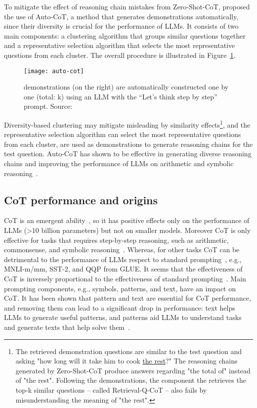 To mitigate the effect of reasoning chain mistakes from Zero-Shot-CoT, \textcite{zhang2022automatic} proposed the use of Auto-CoT, a method that generates demonstrations automatically, since their diversity is crucial for the performance of LLMs.
It consists of two main components: a clustering algorithm that groups similar questions together and a representative selection algorithm that selects the most representative questions from each cluster.
The overall procedure is illustrated in Figure~\ref{fig:auto-cot}.
\begin{figure}[h!]
	\centering
	\texttt{[image: auto-cot]}
	\caption{demonstrations (on the right) are automatically constructed one by one (total: k) using an LLM with the “Let’s think step by step” prompt. Source: \textcite{zhang2022automatic}}
	\label{fig:auto-cot}
\end{figure}
Diversity-based clustering may mitigate misleading by similarity effects\footnote{The retrieved demonstration questions are similar to the test question and asking "how long will it take him to cook \underline{the rest}?" The reasoning chains generated by Zero-Shot-CoT produce answers regarding "the total of" instead of "the rest". Following the demonstrations, the component the retrieves the top-k similar questions -- called Retrieval-Q-CoT -- also fails by misunderstanding the meaning of "the rest".}, and the representative selection algorithm can select the most representative questions from each cluster, are used as demonstrations to generate reasoning chains for the test question.
Auto-CoT has shown to be effective in generating diverse reasoning chains and improving the performance of LLMs on arithmetic and symbolic reasoning~\cite{zhang2022automatic}.

\subsection{CoT performance and origins}
\label{subsec:cot-performance}

CoT is an emergent ability~\cite{wei2022emergent}, so it has positive effects only on the performance of LLMs (>10 billion parameters) but not on smaller models.
Moreover CoT is only effective for tasks that requires step-by-step reasoning, such as arithmetic, commonsense, and symbolic reasoning~\cite{wei2022chain, miao2021diverse, talmor2019commonsenseqa}.
Whereas, for other tasks CoT can be detrimental to the performance of LLMs respect to standard prompting~\cite{wang2022rationale}, e.g., MNLI-m/mm, SST-2, and QQP from GLUE\cite{wang2018glue}.
It seems that the effectiveness of CoT is inversely proportional to the effectiveness of standard prompting~\cite{wei2022chain}.
Main prompting components, e.g., symbols, patterns, and text, have an impact on CoT.
It has been shown that pattern and text are essential for CoT performance, and removing them can lead to a significant drop in performance: text helps LLMs
to generate useful patterns, and patterns aid LLMs to understand tasks and generate texts that help solve them~\cite{madaan2022text}.

